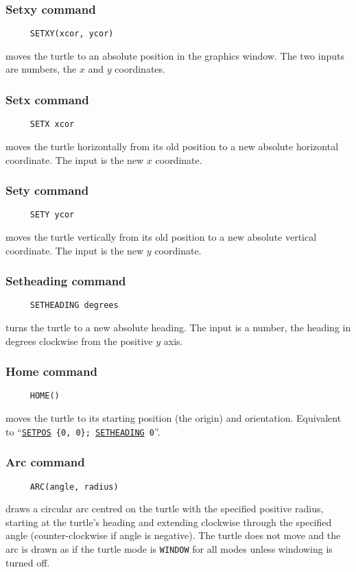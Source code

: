 \subsubsection*{Setxy command}
\begin{verbatim}
     SETXY(xcor, ycor)
\end{verbatim}
moves the turtle to an absolute position in the graphics window.  The
two inputs are numbers, the $x$ and $y$ coordinates.

\subsubsection*{Setx command}
\begin{verbatim}
     SETX xcor
\end{verbatim}
moves the turtle horizontally from its old position to a new absolute
horizontal coordinate.  The input is the new $x$ coordinate.

\subsubsection*{Sety command}
\begin{verbatim}
     SETY ycor
\end{verbatim}
moves the turtle vertically from its old position to a new absolute
vertical coordinate.  The input is the new $y$ coordinate.

\subsubsection*{Setheading command}
\begin{verbatim}
     SETHEADING degrees
\end{verbatim}
\label{logoturtle:setheading}
turns the turtle to a new absolute heading.  The input is a number,
the heading in degrees clockwise from the positive $y$ axis.

\subsubsection*{Home command}
\begin{verbatim}
     HOME()
\end{verbatim}
\label{logoturtle:home}
moves the turtle to its starting position (the origin) and orientation.
Equivalent to ``\texttt{\hyperref[logoturtle:setpos]{SETPOS}~\{0,~0\};
  \hyperref[logoturtle:setheading]{SETHEADING}~0}''.

\subsubsection*{Arc command}
\begin{verbatim}
     ARC(angle, radius)
\end{verbatim}
draws a circular arc centred on the turtle with the specified positive
radius, starting at the turtle's heading and extending clockwise
through the specified angle (counter-clockwise if angle is negative).
The turtle does not move and the arc is drawn as if the turtle mode is
\texttt{WINDOW} for all modes unless windowing is turned off.

